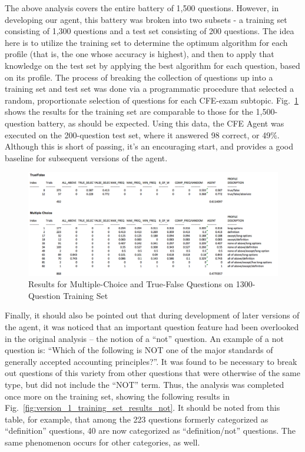 The above analysis covers the entire battery of 1,500 questions.  However, in developing our agent, this battery was broken into two subsets - a training set consisting of 1,300 questions and a test set consisting of 200 questions.  The idea here is to utilize the training set to determine the optimum algorithm for each profile (that is, the one whose accuracy is highest), and then to apply that knowledge on the test set by applying the best algorithm for each question, based on its profile.  The process of breaking the collection of questions up into a training set and test set was done via a programmatic procedure that selected a random, proportionate selection of questions for each CFE-exam subtopic.  Fig.~\ref{fig:version_1_training_set_results} shows the results for the training set are comparable to those for the 1,500-question battery, as should be expected.  Using this data, the CFE Agent was executed on the 200-question test set, where it answered 98 correct, or 49\%.  Although this is short of passing, it's an encouraging start, and provides a good baseline for subsequent versions of the agent.

\begin{figure}
\centering
\includegraphics[width=130mm]{version_1_training_set_results.png}
\caption{Results for Multiple-Choice and True-False Questions on 1300-Question Training Set}
\label{fig:version_1_training_set_results}
\end{figure}

Finally, it should also be pointed out that during development of later versions of the agent, it was noticed that an important question feature had been overlooked in the original analysis -- the notion of a ``not'' question.  An example of a not question is:  ``Which of the following is NOT one of the major standards of generally accepted accounting principles?''.  It was found to be necessary to break out questions of this variety from other questions that were otherwise of the same type, but did not include the ``NOT'' term.  Thus, the analysis was completed once more on the training set, showing the following results in Fig.~\ref{fig:version_1_training_set_results_not}.  It should be noted from this table, for example, that among the 223 questions formerly  categorized as ``definition'' questions, 40 are now categorized as ``definition/not'' questions.  The same phenomenon occurs for other categories, as well.  

